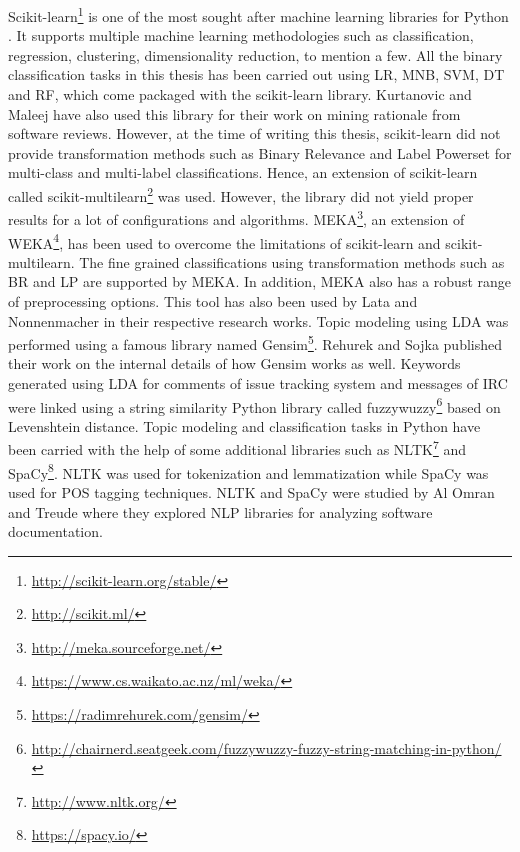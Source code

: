 \documentclass[a4paper,12pt,twoside]{report}
\begin{document}
Scikit-learn\footnote{\url{http://scikit-learn.org/stable/}} is one of the most sought after machine learning libraries for Python \cite{Pedregosa2012}. It supports multiple machine learning methodologies such as classification, regression, clustering, dimensionality reduction, to mention a few. All the binary classification tasks in this thesis has been carried out using \acs{LR}, \acs{MNB}, \acs{SVM}, \acs{DT} and \acs{RF}, which come packaged with the scikit-learn library. Kurtanovic and Maleej \cite{Kurtanovic2017} have also used this library for their work on mining rationale from software reviews. However, at the time of writing this thesis, scikit-learn did not provide transformation methods such as Binary Relevance and Label Powerset for multi-class and multi-label classifications. Hence, an extension of scikit-learn called scikit-multilearn\footnote{\url{http://scikit.ml/}} was used. However, the library did not yield proper results for a lot of configurations and algorithms. 
\newline \newline
MEKA\footnote{\url{http://meka.sourceforge.net/}}\cite{MEKA2016}, an extension of \acs{WEKA}\footnote{\url{https://www.cs.waikato.ac.nz/ml/weka/}}, has been used to overcome the limitations of scikit-learn and scikit-multilearn. The fine grained classifications using transformation methods such as \acs{BR} and \acs{LP} are supported by MEKA. In addition, MEKA also has a robust range of preprocessing options. This tool has also been used by Lata \cite{Lata2016} and Nonnenmacher \cite{Nonnenmacher2017} in their respective research works.
\newline \newline
Topic modeling using \acs{LDA} was performed using a famous library named Gensim\footnote{\url{https://radimrehurek.com/gensim/}}. Rehurek and Sojka \cite{Rehurek2010} published their work on the internal details of how Gensim works as well. Keywords generated using \acs{LDA} for comments of issue tracking system and messages of \acs{IRC} were linked using a string similarity Python library called fuzzywuzzy\footnote{\url{http://chairnerd.seatgeek.com/fuzzywuzzy-fuzzy-string-matching-in-python/}} based on Levenshtein distance.
\newline \newline
Topic modeling and classification tasks in Python have been carried with the help of some additional libraries such as NLTK\footnote{\url{http://www.nltk.org/}} and SpaCy\footnote{\url{https://spacy.io/}}. NLTK was used for tokenization and lemmatization while SpaCy was used for \acs{POS} tagging techniques. NLTK and SpaCy were studied by Al Omran and Treude \cite{AlOmran2017} where they explored \acs{NLP} libraries for analyzing software documentation. 
\end{document}
